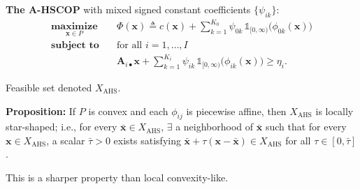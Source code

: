\documentclass[aspectratio=169,xcolor=dvipsnames]{beamer}
\begin{document}
\begin{frame}
  \small
  \setlength{\abovedisplayskip}{4pt}
  \setlength{\belowdisplayskip}{4pt}

  \textbf{The A-HSCOP} with \textcolor{MediumRed}{mixed signed} constant
  coefficients $\{\psi_{ik}\}$:
  \[
    \boxed{
    \begin{aligned}
      \operatorname*{\textbf{maximize}}_{\mathbf{x}\in P}\quad
      &\Phi(\mathbf{x})\triangleq c(\mathbf{x})
        +\sum_{k=1}^{K_0}\psi_{0k}\,
        \mathds{1}_{[0,\infty)}\bigl(\phi_{0k}(\mathbf{x})\bigr)\\[2pt]
      \operatorname*{\textbf{subject to}}\quad
      &\text{for all }i=1,\ldots,I\\[2pt]
      &\mathbf{A}_{i\bullet}\mathbf{x}
        +\sum_{k=1}^{K_i}\psi_{ik}\,
        \mathds{1}_{[0,\infty)}\bigl(\phi_{ik}(\mathbf{x})\bigr)\geq\eta_i.
    \end{aligned}}
  \]

  \vspace{0.06cm}
  Feasible set denoted $X_{\mathrm{AHS}}$.

  \vspace{0.10cm}
  \textbf{Proposition:} If $P$ is convex and each $\phi_{ij}$ is piecewise
  affine, then $X_{\mathrm{AHS}}$ is {\color{MediumBlue}locally star-shaped};
  i.e., for every $\bar{\mathbf{x}}\in X_{\mathrm{AHS}}$, $\exists$ a
  neighborhood of $\bar{\mathbf{x}}$ such that for every
  $\mathbf{x}\in X_{\mathrm{AHS}}$, a scalar $\bar{\tau}>0$ exists satisfying
  $\bar{\mathbf{x}}+\tau(\mathbf{x}-\bar{\mathbf{x}})\in X_{\mathrm{AHS}}$ for
  all $\tau\in[0,\bar{\tau}]$.

  \vspace{0.06cm}
  This is a sharper property than local convexity-like.
\end{frame}
\end{document}
